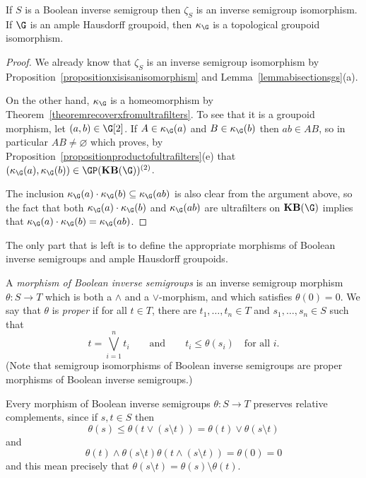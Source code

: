 \begin{proposition}[{\cite[Proposition 2.23]{MR2827424}}]\label{propositionnaturaltransformationsncsd}
If $S$ is a Boolean inverse semigroup then $\zeta_S$ is an inverse semigroup isomorphism. If $\G$ is an ample Hausdorff groupoid, then $\kappa_{\G}$ is a topological groupoid isomorphism.
\end{proposition}
\begin{proof}
We already know that $\zeta_S$ is an inverse semigroup isomorphism by Proposition~\ref{propositionxisisanisomorphism} and Lemma~\ref{lemmabisectionsgs}(a).

On the other hand, $\kappa_{\G}$ is a homeomorphism by Theorem~\ref{theoremrecoverxfromultrafilters}. To see that it is a groupoid morphism, let $(a,b)\in\G[2]$. If $A\in\kappa_{\G}(a)$ and $B\in\kappa_{\G}(b)$ then $ab\in AB$, so in particular $AB\neq\varnothing$ which proves, by Proposition~\ref{propositionproductofultrafilters}(e) that $(\kappa_{\G}(a),\kappa_{\G}(b))\in\GP(\mathbf{KB}(\G))^{(2)}$.

The inclusion $\kappa_{\G}(a)\cdot \kappa_{\G}(b)\subseteq\kappa_{\G}(ab)$ is also clear from the argument above, so the fact that both $\kappa_{\G}(a)\cdot\kappa_{\G}(b)$ and $\kappa_{\G}(ab)$ are ultrafilters on $\mathbf{KB}(\G)$ implies that $\kappa_{\G}(a)\cdot\kappa_{\G}(b)=\kappa_{\G}(ab)$.\qedhere
\end{proof}

The only part that is left is to define the appropriate morphisms of Boolean inverse semigroups and ample Hausdorff groupoids.

\begin{definition}\label{definitionmorphismofbooleaninversesemigroups}
A \emph{morphism of Boolean inverse semigroups} is an inverse semigroup morphism $\theta:S\to T$ which is both a $\land$ and a $\lor$-morphism, and which satisfies $\theta(0)=0$. We say that $\theta$ is \emph{proper} if for all $t\in T$, there are $t_1,\ldots,t_n\in T$ and $s_1,\ldots,s_n\in S$ such that
\[t=\bigvee_{i=1}^n t_i\qquad\text{and}\qquad t_i\leq\theta(s_i)\quad\text{for all }i.\]
(Note that semigroup isomorphisms of Boolean inverse semigroups are proper morphisms of Boolean inverse semigroups.)
\end{definition}

\begin{remark}
Every morphism of Boolean inverse semigroups $\theta:S\to T$ preserves relative complements, since if $s,t\in S$ then
\[\theta(s)\leq\theta(t\lor(s\setminus t))=\theta(t)\lor\theta(s\setminus t)\]
and
\[\theta(t)\land\theta(s\setminus t)\theta(t\land(s\setminus t))=\theta(0)=0\]
and this mean precisely that $\theta(s\setminus t)=\theta(s)\setminus\theta(t)$.
\end{remark}

